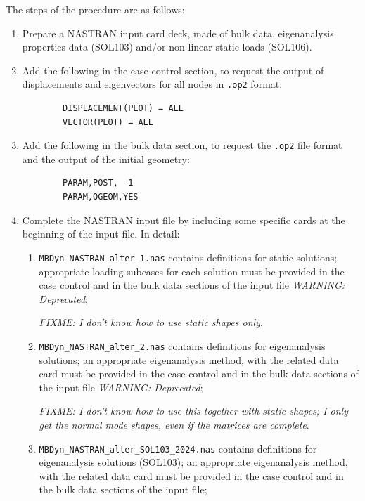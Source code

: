 The steps of the procedure are as follows:
\begin{enumerate} %

\item Prepare a NASTRAN input card deck, made of bulk data,
eigenanalysis properties data (SOL103) and/or non-linear static loads (SOL106). 

\item Add the following  in the case control section, to request
the output of displacements and eigenvectors for all nodes in \texttt{.op2} format: 
	\begin{verbatim}
		DISPLACEMENT(PLOT) = ALL 
		VECTOR(PLOT) = ALL
	\end{verbatim}
\item Add the following  in the bulk data section, to request 
	the \texttt{.op2} file format and the output of the initial geometry:
	\begin{verbatim}
		PARAM,POST, -1
		PARAM,OGEOM,YES
	\end{verbatim}
\item Complete the NASTRAN input file by including some specific 
	 cards at the beginning of the input file.
	In detail:
	\begin{enumerate}
	\item \texttt{MBDyn\_NASTRAN\_alter\_1.nas} contains
		 definitions for static solutions; appropriate
		loading subcases for each solution must be provided
		in the case control and in the bulk data sections
		of the input file \textit{WARNING: Deprecated};

		\emph{FIXME: I don't know how to use static shapes only}.

	\item \texttt{MBDyn\_NASTRAN\_alter\_2.nas} contains
		 definitions for eigenanalysis solutions;
		an appropriate eigenanalysis method, with the related
		data card must be provided in the case control 
		and in the bulk data sections of the input file 
		\textit{WARNING: Deprecated};

		\emph{FIXME: I don't know how to use this together
			with static shapes; I only get the normal mode shapes,
			even if the matrices are complete}.

	\item \texttt{MBDyn\_NASTRAN\_alter\_SOL103\_2024.nas} contains
		 definitions for eigenanalysis solutions (SOL103);
		an appropriate eigenanalysis method, with the related
		data card must be provided in the case control 
		and in the bulk data sections of the input file;


\end{enumerate}
\end{enumerate}
